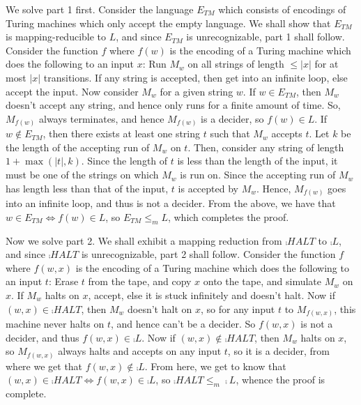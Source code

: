 \begin{soln}
We solve part 1 first.
Consider the language $E_{TM}$ which consists of encodings of Turing machines which only accept the empty language. We shall show that $E_{TM}$ is mapping-reducible to $L$, and since $E_{TM}$ is
unrecognizable, part 1 shall follow.\nl
Consider the function $f$ where $f(w)$ is the encoding of a Turing machine which does the following to an input $x$:\nl
Run $M_w$ on all strings of length $\le |x|$ for at most $|x|$ transitions. If any string is accepted, then get into an infinite loop, else accept the input.\nl
Now consider $M_w$ for a given string $w$. If $w \in E_{TM}$, then $M_w$ doesn't accept any string, and hence only runs for a finite amount of time. So, $M_{f(w)}$ always terminates, and hence
$M_{f(w)}$ is a decider, so $f(w) \in L$.\nl
If $w \not\in E_{TM}$, then there exists at least one string $t$ such that $M_w$ accepts $t$. Let $k$ be the length of the accepting run of $M_w$ on $t$. Then, consider any string of length $1 +
\max(|t|, k)$. Since the length of $t$ is less than the length of the input, it must be one of the strings on which $M_w$ is run on. Since the accepting run of $M_w$ has length less than that of
the input, $t$ is accepted by $M_w$. Hence, $M_{f(w)}$ goes into an infinite loop, and thus is not a decider.\nl
From the above, we have that $w \in E_{TM} \iff f(w) \in L$, so $E_{TM} \le_m L$, which completes the proof.\nl

Now we solve part 2. We shall exhibit a mapping reduction from $\comp{HALT}$ to $\comp{L}$, and since $\comp{HALT}$ is unrecognizable, part 2 shall follow.\nl
Consider the function $f$ where $f(w, x)$ is the encoding of a Turing machine which does the following to an input $t$:\nl
Erase $t$ from the tape, and copy $x$ onto the tape, and simulate $M_w$ on $x$. If $M_w$ halts on $x$, accept, else it is stuck infinitely and doesn't halt.\nl
Now if $(w, x) \in \comp{HALT}$, then $M_w$ doesn't halt on $x$, so for any input $t$ to $M_{f(w, x)}$, this machine never halts on $t$, and hence can't be a decider. So $f(w, x)$ is not a decider,
and thus $f(w, x) \in \comp{L}$.\nl
Now if $(w, x) \not\in \comp{HALT}$, then $M_w$ halts on $x$, so $M_{f(w, x)}$ always halts and accepts on any input $t$, so it is a decider, from where we get that $f(w, x) \not\in
\comp{L}$.\nl
From here, we get to know that $(w, x) \in \comp{HALT} \iff f(w, x) \in \comp{L}$, so $\comp{HALT} \le_m \comp{L}$, whence the proof is complete.
\end{soln}
